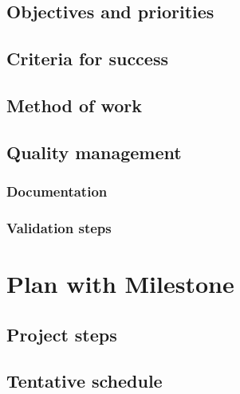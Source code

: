 \documentclass{seal_article}
\begin{document}
\subsection{Objectives and priorities}
\subsection{Criteria for success}
\subsection{Method of work}
\subsection{Quality management}
\subsubsection{Documentation}
\subsubsection{Validation steps}

\section{Plan with Milestone}
\subsection{Project steps}
\subsection{Tentative schedule}
\end{document}

